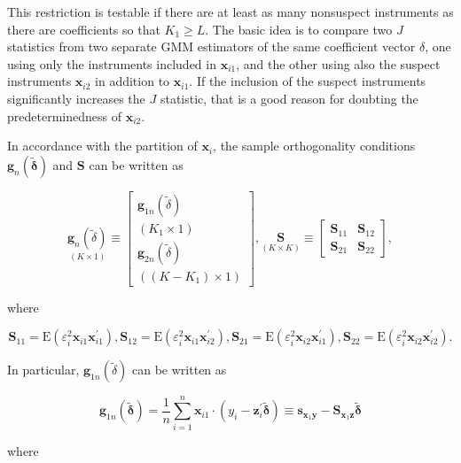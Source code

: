\documentclass[10pt]{article}
\begin{document}
This restriction is testable if there are at least as many nonsuspect instruments as there are coefficients so that $K_{1} \geq L$. The basic idea is to compare two $J$ statistics from two separate GMM estimators of the same coefficient vector $\delta$, one using only the instruments included in $\mathbf{x}_{i 1}$, and the other using also the suspect instruments $\mathbf{x}_{i 2}$ in addition to $\mathbf{x}_{i 1}$. If the inclusion of the suspect instruments significantly increases the $J$ statistic, that is a good reason for doubting the predeterminedness of $\mathbf{x}_{i 2}$.

In accordance with the partition of $\mathbf{x}_{i}$, the sample orthogonality conditions $\mathbf{g}_{n}(\tilde{\boldsymbol{\delta}})$ and $\mathbf{S}$ can be written as

\[
\underset{(K \times 1)}{\mathbf{g}_{n}(\tilde{\delta})} \equiv\left[\begin{array}{c}
\mathbf{g}_{1 n}(\tilde{\delta})  \tag{3.6.5}\\
\left(K_{1} \times 1\right) \\
\mathbf{g}_{2 n}(\tilde{\delta}) \\
\left(\left(K-K_{1}\right) \times 1\right)
\end{array}\right], \underset{(K \times K)}{\mathbf{S}} \equiv\left[\begin{array}{ll}
\mathbf{S}_{11} & \mathbf{S}_{12} \\
\mathbf{S}_{21} & \mathbf{S}_{22}
\end{array}\right],
\]

where

$$
\mathbf{S}_{11}=\mathrm{E}\left(\varepsilon_{i}^{2} \mathbf{x}_{i 1} \mathbf{x}_{i 1}^{\prime}\right), \mathbf{S}_{12}=\mathrm{E}\left(\varepsilon_{i}^{2} \mathbf{x}_{i 1} \mathbf{x}_{i 2}^{\prime}\right), \mathbf{S}_{21}=\mathrm{E}\left(\varepsilon_{i}^{2} \mathbf{x}_{i 2} \mathbf{x}_{i 1}^{\prime}\right), \mathbf{S}_{22}=\mathrm{E}\left(\varepsilon_{i}^{2} \mathbf{x}_{i 2} \mathbf{x}_{i 2}^{\prime}\right) .
$$

In particular, $\mathbf{g}_{1 n}(\tilde{\delta})$ can be written as

$$
\mathbf{g}_{1 n}(\tilde{\boldsymbol{\delta}})=\frac{1}{n} \sum_{i=1}^{n} \mathbf{x}_{i 1} \cdot\left(y_{i}-\mathbf{z}_{i}^{\prime} \tilde{\boldsymbol{\delta}}\right) \equiv \mathbf{s}_{\mathbf{x}_{1} \mathbf{y}}-\mathbf{S}_{\mathbf{x}_{1} \mathbf{z}} \tilde{\boldsymbol{\delta}}
$$

where
\end{document}
